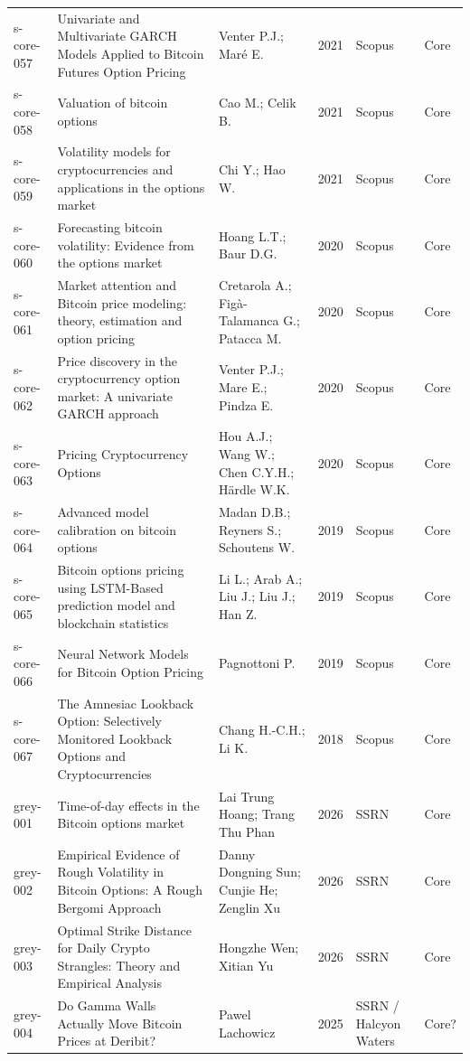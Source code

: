 \documentclass[11pt,a4paper]{article}
\begin{document}
\begin{longtable}{p{}p{}p{}p{}p{}p{}}
s-core-057 & Univariate and Multivariate GARCH Models Applied to Bitcoin Futures Option Pricing & Venter P.J.; Maré E. & 2021 & Scopus & Core \\
s-core-058 & Valuation of bitcoin options & Cao M.; Celik B. & 2021 & Scopus & Core \\
s-core-059 & Volatility models for cryptocurrencies and applications in the options market & Chi Y.; Hao W. & 2021 & Scopus & Core \\
s-core-060 & Forecasting bitcoin volatility: Evidence from the options market & Hoang L.T.; Baur D.G. & 2020 & Scopus & Core \\
s-core-061 & Market attention and Bitcoin price modeling: theory, estimation and option pricing & Cretarola A.; Figà-Talamanca G.; Patacca M. & 2020 & Scopus & Core \\
s-core-062 & Price discovery in the cryptocurrency option market: A univariate GARCH approach & Venter P.J.; Mare E.; Pindza E. & 2020 & Scopus & Core \\
s-core-063 & Pricing Cryptocurrency Options & Hou A.J.; Wang W.; Chen C.Y.H.; Härdle W.K. & 2020 & Scopus & Core \\
s-core-064 & Advanced model calibration on bitcoin options & Madan D.B.; Reyners S.; Schoutens W. & 2019 & Scopus & Core \\
s-core-065 & Bitcoin options pricing using LSTM-Based prediction model and blockchain statistics & Li L.; Arab A.; Liu J.; Liu J.; Han Z. & 2019 & Scopus & Core \\
s-core-066 & Neural Network Models for Bitcoin Option Pricing & Pagnottoni P. & 2019 & Scopus & Core \\
s-core-067 & The Amnesiac Lookback Option: Selectively Monitored Lookback Options and Cryptocurrencies & Chang H.-C.H.; Li K. & 2018 & Scopus & Core \\
grey-001 & Time-of-day effects in the Bitcoin options market & Lai Trung Hoang; Trang Thu Phan & 2026 & SSRN & Core \\
grey-002 & Empirical Evidence of Rough Volatility in Bitcoin Options: A Rough Bergomi Approach & Danny Dongning Sun; Cunjie He; Zenglin Xu & 2026 & SSRN & Core \\
grey-003 & Optimal Strike Distance for Daily Crypto Strangles: Theory and Empirical Analysis & Hongzhe Wen; Xitian Yu & 2026 & SSRN & Core \\
grey-004 & Do Gamma Walls Actually Move Bitcoin Prices at Deribit? & Pawel Lachowicz & 2025 & SSRN / Halcyon Waters & Core? \\
\bottomrule
\end{longtable}
\endgroup
\end{document}
